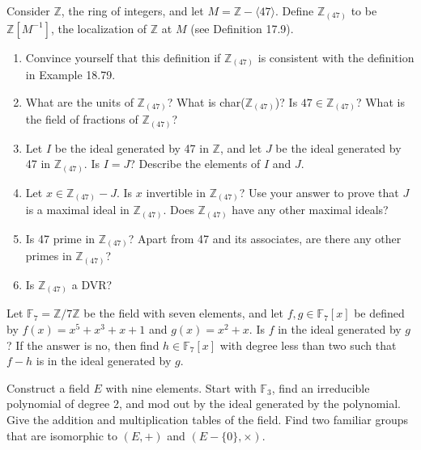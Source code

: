 \documentclass[12pt,letterpaper,boxed]{hmcpset}
\begin{document}

\begin{problem}[18.6.4]
Consider $\mathbb{Z}$, the ring of integers, and let $M = \mathbb{Z} - \langle 47 \rangle$. Define $\mathbb{Z}_{(47)}$ to be $\mathbb{Z}[M^{-1}]$, the localization of $\mathbb{Z}$ at $M$ (see Definition 17.9).
\begin{enumerate}[label=\alph*]
\item Convince yourself that this definition if $\mathbb{Z}_{(47)}$ is consistent with the definition in Example 18.79.
\item What are the units of $\mathbb{Z}_{(47)}$? What is char($\mathbb{Z}_{(47)}$)? Is $47 \in \mathbb{Z}_{(47)}$? What is the field of fractions of $\mathbb{Z}_{(47)}$?
\item Let  $I$ be the ideal generated by 47 in $\mathbb{Z}$, and let $J$ be the ideal generated by 47 in $\mathbb{Z}_{(47)}$. Is $I = J$? Describe the elements of $I$ and $J$.
\item Let $x \in \mathbb{Z}_{(47)} - J$. Is $x$ invertible in $\mathbb{Z}_{(47)}$? Use your answer to prove that $J$ is a maximal ideal in $\mathbb{Z}_{(47)}$. Does $\mathbb{Z}_{(47)}$ have any other maximal ideals?
\item Is 47 prime in $\mathbb{Z}_{(47)}$? Apart from 47 and its associates, are there any other primes in $\mathbb{Z}_{(47)}$?
\item Is $\mathbb{Z}_{(47)}$ a DVR?
\end{enumerate}
\end{problem}

\begin{solution}
\end{solution}

\clearpage

\begin{problem}[19.2.8]
Let $\mathbb{F}_7 = \mathbb{Z}/7\mathbb{Z}$ be the field with seven elements, and let $f,g \in \mathbb{F}_7[x]$ be defined by $f(x) = x^5 + x^3 + x + 1$ and $g(x) = x^2 + x$. Is $f$ in the ideal generated by $g$? If the answer is no, then find $h \in \mathbb{F}_7[x]$ with degree less than two such that $f-h$ is in the ideal generated by $g$.
\end{problem}

\begin{solution}
\end{solution}

\clearpage

\begin{problem}[19.3.4]
Construct a field $E$ with nine elements. Start with $\mathbb{F}_3$, find an irreducible polynomial of degree 2, and mod out by the ideal generated by the polynomial. Give the addition and multiplication tables of the field. Find two familiar groups that are isomorphic to $(E,+)$ and $(E-\{0\},\times)$.
\end{problem}
\end{document}
